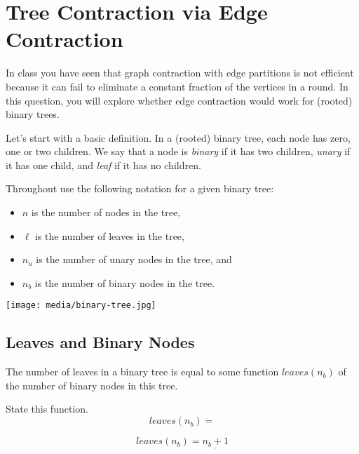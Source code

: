 
\section{Tree Contraction via Edge Contraction}

In class you have seen that graph contraction with edge partitions is
not efficient because it can fail to eliminate a constant fraction of
the vertices in a round.  
%
In this question, you will explore whether edge contraction would work
for (rooted) binary trees.

Let's start with a basic definition. 
%
In a (rooted) binary tree, each node has zero, one or two children. 
%
We say that
a node is {\em binary} if it has two children, {\em unary} if it has
one child, and {\em leaf} if it has no children.  
%


Throughout use the following notation for a given binary tree:
%
{
\flushleft
\begin{minipage}[b]{4in}
\begin{itemize}
\item $n$ is the number of nodes in the tree,
\item $\ell$ is the number of leaves in the tree, 
\item $n_u$ is the number of unary nodes in the tree, and 
\item $n_b$ is the number of binary nodes in the tree.
\end{itemize}
\end{minipage}
\begin{minipage}{2in}
\begin{center}
\texttt{[image: media/binary-tree.jpg]}
\end{center}
\end{minipage}
}


\subsection{Leaves and Binary Nodes}

\begin{problem}
The number of leaves in a binary tree  is equal to some function $\mathit{leaves}(n_b)$
of the number of binary nodes in this tree.
%

\ask[4]
State this function.
%
\[
\mathit{leaves}(n_b) = 
\]

\sol
\[
\mathit{leaves}(n_b) = \underline{n_b + 1}
\]
\end{problem}

